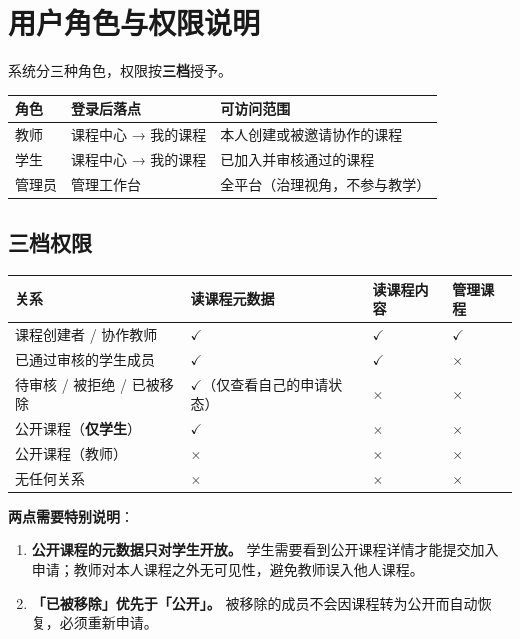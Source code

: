 \documentclass[UTF8,a4paper,11pt]{ctexrep}
\begin{document}
\section{用户角色与权限说明}

系统分三种角色，权限按\textbf{三档}授予。

\begin{center}
\small
\begin{tabularx}{\linewidth}{@{}XXX@{}}
\toprule
角色 & 登录后落点 & 可访问范围 \\
\midrule
教师 & 课程中心 → 我的课程 & 本人创建或被邀请协作的课程 \\
学生 & 课程中心 → 我的课程 & 已加入并审核通过的课程 \\
管理员 & 管理工作台 & 全平台（治理视角，不参与教学） \\
\bottomrule
\end{tabularx}
\end{center}

\subsection{三档权限}

\begin{center}
\small
\begin{tabularx}{\linewidth}{@{}XXXX@{}}
\toprule
关系 & 读课程元数据 & 读课程内容 & 管理课程 \\
\midrule
课程创建者 / 协作教师 & $\checkmark$ & $\checkmark$ & $\checkmark$ \\
已通过审核的学生成员 & $\checkmark$ & $\checkmark$ & $\times$ \\
待审核 / 被拒绝 / 已被移除 & $\checkmark$（仅查看自己的申请状态） & $\times$ & $\times$ \\
公开课程（\textbf{仅学生}） & $\checkmark$ & $\times$ & $\times$ \\
公开课程（教师） & $\times$ & $\times$ & $\times$ \\
无任何关系 & $\times$ & $\times$ & $\times$ \\
\bottomrule
\end{tabularx}
\end{center}
\textbf{两点需要特别说明}：

\begin{enumerate}
\item \textbf{公开课程的元数据只对学生开放。} 学生需要看到公开课程详情才能提交加入申请；教师对本人课程之外无可见性，避免教师误入他人课程。
\item \textbf{「已被移除」优先于「公开」。} 被移除的成员不会因课程转为公开而自动恢复，必须重新申请。
\end{enumerate}
\end{document}
